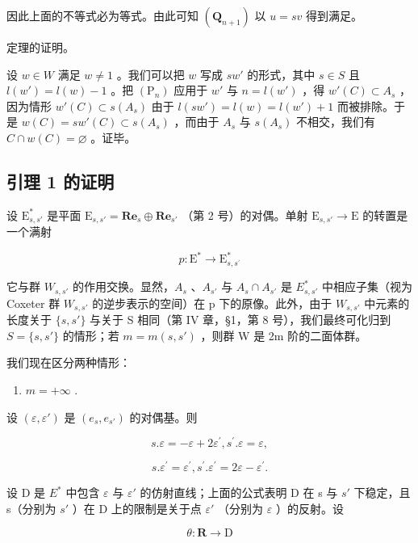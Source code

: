 因此上面的不等式必为等式。由此可知 \((\mathbf{Q}_{n + 1})\) 以 \(u = sv\) 得到满足。

定理的证明。

设 \(w \in W\) 满足 \(w \neq 1\) 。我们可以把 \(w\) 写成 \(sw'\) 的形式，其中 \(s \in S\) 且 \(l(w') = l(w) - 1\) 。把 \((\mathrm{P}_n)\) 应用于 \(w'\) 与 \(n = l(w')\) ，得 \(w'(C) \subset A_s\) ，因为情形 \(w'(C) \subset s(A_s)\) 由于 \(l(sw') = l(w) = l(w') + 1\) 而被排除。于是 \(w(C) = sw'(C) \subset s(A_s)\) ，而由于 \(A_s\) 与 \(s(A_s)\) 不相交，我们有 \(C \cap w(C) = \varnothing\) 。证毕。

\subsection{引理 1 的证明}

设 \(\mathrm{E}_{s,s'}^*\) 是平面 \(\mathrm{E}_{s,s'} = \mathbf{Re}_s\oplus \mathbf{Re}_{s'}\) （第 2 号）的对偶。单射 \(\mathrm{E}_{s,s'}\to \mathrm{E}\) 的转置是一个满射

\[
p: \mathrm{E} ^ {*} \to \mathrm{E} _ {s, s ^ {\prime}} ^ {*}
\]

它与群 \(W_{s,s'}\) 的作用交换。显然，\(A_{s}\) 、\(A_{s'}\) 与 \(A_{s} \cap A_{s'}\) 是 \(E_{s,s'}^{*}\) 中相应子集（视为 Coxeter 群 \(W_{s,s'}\) 的逆步表示的空间）在 p 下的原像。此外，由于 \(W_{s,s'}\) 中元素的长度关于 \(\{s,s'\}\) 与关于 S 相同（第 IV 章，§1，第 8 号），我们最终可化归到 \(S = \{s,s'\}\) 的情形；若 \(m = m(s,s')\) ，则群 W 是 2m 阶的二面体群。

我们现在区分两种情形：

\begin{enumerate}
\def\labelenumi{\alph{enumi})}
\tightlist
\item
  \(m = +\infty\) .
\end{enumerate}

设 \((\varepsilon, \varepsilon')\) 是 \((e_s, e_{s'})\) 的对偶基。则

\[
s. \varepsilon = - \varepsilon + 2 \varepsilon^ {\prime}, s ^ {\prime}. \varepsilon = \varepsilon ,
\]

\[
s. \varepsilon^ {\prime} = \varepsilon^ {\prime}, s ^ {\prime}. \varepsilon^ {\prime} = 2 \varepsilon - \varepsilon^ {\prime}.
\]

设 D 是 \(E^{*}\) 中包含 \(\varepsilon\) 与 \(\varepsilon'\) 的仿射直线；上面的公式表明 D 在 s 与 \(s'\) 下稳定，且 s（分别为 \(s'\) ）在 D 上的限制是关于点 \(\varepsilon'\) （分别为 \(\varepsilon\) ）的反射。设

\[
\theta : \mathbf {R} \to \mathrm{D}
\]

